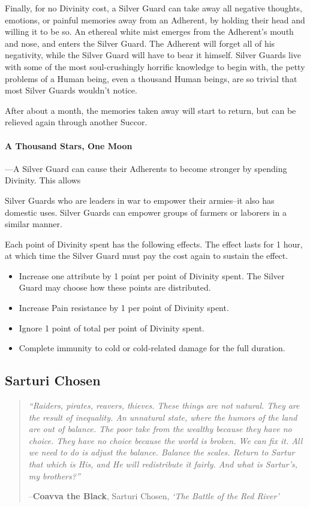\documentclass[oneside,11pt,english]{book}
\begin{document}
Finally, for no Divinity cost, a Silver Guard can take away all negative thoughts, emotions, or 
painful memories away from an Adherent, by holding their head and willing it to be so. An 
ethereal white mist emerges from the Adherent's mouth and nose, and enters the Silver Guard. 
The Adherent will forget all of his negativity, while the Silver Guard will have to bear it himself. 
Silver Guards live with some of the most soul-crushingly horrific knowledge to begin with, the 
petty problems of a Human being, even a thousand Human beings, are so trivial that most Silver 
Guards wouldn't notice. 

After about a month, the memories taken away will start to return, but can be relieved again 
through another Succor. 

\paragraph{A Thousand Stars, One Moon}
---\quad A Silver Guard can cause their Adherents to become stronger by spending Divinity. This allows 

Silver Guards who are leaders in war to empower their armies--it also has domestic uses. Silver 
Guards can empower groups of farmers or laborers in a similar manner. 

Each point of Divinity spent has the following effects. The effect lasts for 1 hour, at which time 
the Silver Guard must pay the cost again to sustain the effect. 
\begin{itemize}
\item Increase one attribute by 1 point per point of Divinity spent. The Silver Guard may 
  choose how these points are distributed. 
\item Increase Pain resistance by 1 per point of Divinity spent. 
\item Ignore 1 point of total  per point of Divinity spent. 
\item Complete immunity to cold or cold-related damage for the full duration. 
\end{itemize}
\subsection{Sarturi Chosen}\label{sec:sarturi-chosen}
\begin{quotation}
  {\emph{“Raiders, pirates, reavers, thieves. These things are not natural. They
      are the result of inequality. An unnatural state, where the humors of the
      land are out of balance. The poor take from the wealthy because they have
      no choice. They have no choice because the world is broken. We can fix it.
      All we need to do is adjust the balance. Balance the scales. Return to
      Sartur that which is His, and He will redistribute it fairly. And what is
      Sartur’s, my brothers?”} 

    \hfill--\textbf{Coavva the Black}, Sarturi Chosen, \textit{‘The Battle of the Red River’}}
\end{quotation}
\end{document}
